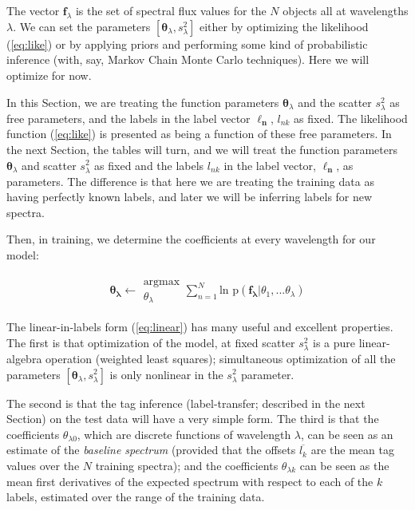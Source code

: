 \documentclass[12pt, preprint]{aastex}
\newcommand{\sectionname}{Section}
\newcommand{\set}[1]{\bm{#1}}
\newcommand{\mean}[1]{\overline{#1}}
\begin{document}
The vector $\set{f}_\lambda$ is the set of spectral flux values for
the $N$ objects all at wavelengths $\lambda$.
We can set the parameters $[\set{\theta}_\lambda,s_\lambda^2]$ either by
optimizing the likelihood (\ref{eq:like}) or by applying priors and
performing some kind of probabilistic inference (with, say, Markov
Chain Monte Carlo techniques).
Here we will optimize for now.

In this \sectionname, we are treating the function parameters
$\set{\theta}_\lambda$ and the scatter $s_\lambda^2$ as free parameters, and the
labels in the label vector $\set{\ell_n}$, $l_{nk}$ as fixed.
The likelihood function (\ref{eq:like}) is presented as being a
function of these free parameters.
In the next \sectionname, the tables will turn, and we will treat the
function parameters $\set{\theta}_\lambda$ and scatter $s_{\lambda}^2$ as fixed and
the labels $l_{nk}$ in the label vector, $\set{\ell_n}$, as parameters.
The difference is that here we are treating the training data as
having perfectly known labels, and later we will be inferring labels for
new spectra.

Then, in training, we determine the coefficients at every wavelength for our model:

\begin{eqnarray}
\set{\theta_\lambda} \leftarrow \substack{\mbox{argmax}\\
{\theta_\lambda}  }
\sum_{n=1}^N \mbox{ln p}(\set{f_\lambda} | {\theta_1,...\theta_\lambda})
\end{eqnarray}

The linear-in-labels form (\ref{eq:linear}) has many useful and
excellent properties.
The first is that optimization of the model, at fixed scatter
$s_\lambda^2$ is a pure linear-algebra operation (weighted least
squares); simultaneous optimization of all the parameters
$[\set{\theta}_\lambda,s_\lambda^2]$ is only nonlinear in the $s_\lambda^2$
parameter.

%
The second is that the tag inference (label-transfer; described in the
next Section) on the test data will have a very simple form.
The third is that the coefficients $\theta_{\lambda 0}$, which are discrete
functions of wavelength $\lambda$, can be seen as an estimate of
the \emph{baseline spectrum} (provided that the offsets $\mean{l_k}$ are
the mean tag values over the $N$ training spectra); and the
coefficients $\theta_{\lambda k}$ can be seen as the mean first derivatives of
the expected spectrum with respect to each of the $k$ labels, estimated
over the range of the training data.
\end{document}
